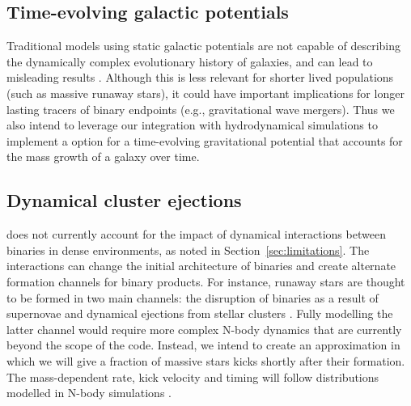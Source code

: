 \documentclass[twocolumn, twocolappendix, oneside, linenumbers]{aastex631}
\begin{document}
\subsection{Time-evolving galactic potentials}\label{sec:time-evolving-potentials}
Traditional models using static galactic potentials are not capable of describing the dynamically complex evolutionary history of galaxies, and can lead to misleading results \citep[e.g.,][]{Arora+2022}. Although this is less relevant for shorter lived populations (such as massive runaway stars), it could have important implications for longer lasting tracers of binary endpoints (e.g., gravitational wave mergers). Thus we also intend to leverage our integration with hydrodynamical simulations to implement a \cogsworth option for a time-evolving gravitational potential that accounts for the mass growth of a galaxy over time.

\subsection{Dynamical cluster ejections}\label{sec:cluster_ejections}

\cogsworth does not currently account for the impact of dynamical interactions between binaries in dense environments, as noted in Section~\ref{sec:limitations}. The interactions can change the initial architecture of binaries \citep[e.g.,][]{Fujii+2011:2011Sci...334.1380F} and create alternate formation channels for binary products. For instance, runaway stars are thought to be formed in two main channels: the disruption of binaries as a result of supernovae \citep{Blaauw+1961, Eldridge+2011:2011MNRAS.414.3501E, Renzo+2019:2019A&A...624A..66R} and dynamical ejections from stellar clusters \citep{Poveda+1967}. Fully modelling the latter channel would require more complex N-body dynamics that are currently beyond the scope of the code. Instead, we intend to create an approximation in which we will give a fraction of massive stars kicks shortly after their formation. The mass-dependent rate, kick velocity and timing will follow distributions modelled in N-body simulations \cite[e.g.,][]{Oh+2016:2016A&A...590A.107O, Schoettler+2022:2022MNRAS.510.3178S}.
\end{document}
